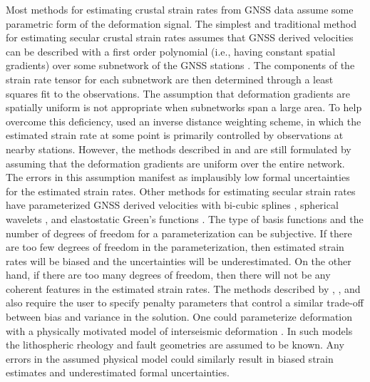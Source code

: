 \documentclass[10pt,letter]{article}
\begin{document}
Most methods for estimating crustal strain rates from GNSS data assume some parametric form of the deformation signal. The simplest and traditional method for estimating secular crustal strain rates assumes that GNSS derived velocities can be described with a first order polynomial (i.e., having constant spatial gradients) over some subnetwork of the GNSS stations \citep[e.g.,][]{Frank1966,Prescott1976,Savage1986,Feigl1990,Murray2000}. The components of the strain rate tensor  for each subnetwork are then determined through a least squares fit to the observations. The assumption that deformation gradients are spatially uniform is not appropriate when subnetworks span a large area.  To help overcome this deficiency, \citet{Shen1996,Shen2015} used an inverse distance weighting scheme, in which the estimated strain rate at some point is primarily controlled by observations at nearby stations. However, the methods described in \citet{Shen1996} and \citet{Shen2015} are still formulated by assuming that the deformation gradients are uniform over the entire network. The errors in this assumption manifest as implausibly low formal uncertainties for the estimated strain rates. Other methods for estimating secular strain rates have parameterized GNSS derived velocities with bi-cubic splines \citep{Beavan2001}, spherical wavelets \citep{Tape2009}, and elastostatic Green's functions \citep{Sandwell2016}. The type of basis functions and the number of degrees of freedom for a parameterization can be subjective. If there are too few degrees of freedom in the parameterization, then estimated strain rates will be biased and the uncertainties will be underestimated. On the other hand, if there are too many degrees of freedom, then there will not be any coherent features in the estimated strain rates. The methods described by \citet{Beavan2001}, \citet{Tape2009}, and \citet{Sandwell2016} also require the user to specify penalty parameters that control a similar trade-off between bias and variance in the solution. One could parameterize deformation with a physically motivated model of interseismic deformation \citep[e.g.,][]{Meade2005,McCaffrey2007}. In such models the lithospheric rheology and fault geometries are assumed to be known. Any errors in the assumed physical model could similarly result in biased strain estimates and underestimated formal uncertainties. 
\end{document}
